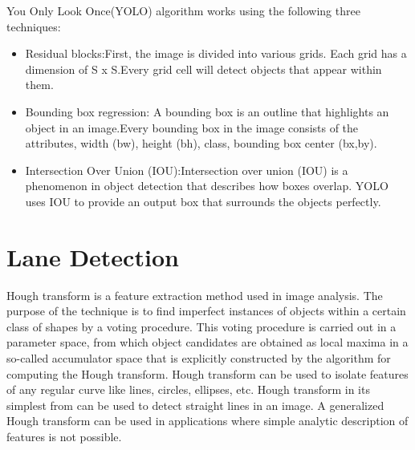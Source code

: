 You Only Look Once(YOLO) algorithm works using the following three techniques:

\begin{itemize}
\item Residual blocks:First, the image is divided into various grids. Each grid has a dimension of S x S.Every grid cell will detect objects that appear within them.
\item Bounding box regression: A bounding box is an outline that highlights an object in an image.Every bounding box in the image consists of the attributes, width (bw), height (bh), class, bounding box center (bx,by).
\item Intersection Over Union (IOU):Intersection over union (IOU) is a phenomenon in object detection that describes how boxes overlap. YOLO uses IOU to provide an output box that surrounds the objects perfectly.
\end{itemize}

\section{Lane Detection}
Hough transform is a feature extraction method used in image analysis. The purpose of the technique is to find imperfect instances of objects within a certain class of shapes by a voting procedure. This voting procedure is carried out in a parameter space, from which object candidates are obtained as local maxima in a so-called accumulator space that is explicitly constructed by the algorithm for computing the Hough transform. Hough transform can be used to isolate features of any regular curve like lines, circles, ellipses, etc. Hough transform in its simplest from can be used to detect straight lines in an image. A generalized Hough transform can be used in applications where simple analytic description of features is not possible. 

